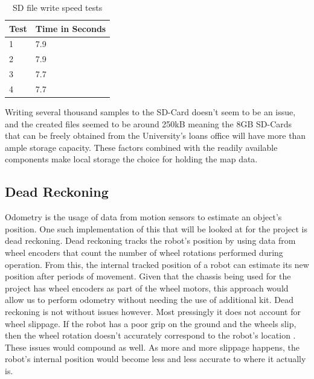 					\begin{table}[h!]
						\centering
						\begin{tabular}{|| l | l ||} 
							\hline
							Test & Time in Seconds \\ [0.5ex] 
							\hline
							1 & 7.9 \\ 
							2 & 7.9 \\
							3 & 7.7 \\
							4 & 7.7 \\ [1ex] 
							\hline
						\end{tabular}
						\caption{SD file write speed tests}
						\label{table:filewritetests}		
					\end{table}
					Writing several thousand samples to the SD-Card doesn't seem to be an issue, and the created files seemed to be around 250kB meaning the 8GB SD-Cards that can be freely obtained from the University's loans office will have more than ample storage capacity. These factors combined with the readily available components make local storage the choice for holding the map data.
				
				\subsection{Dead Reckoning}
				Odometry is the usage of data from motion sensors to estimate an object's position. One such implementation of this that will be looked at for the project is dead reckoning. Dead reckoning tracks the robot's position by using data from wheel encoders that count the number of wheel rotations performed during operation. From this, the internal tracked position of a robot can estimate its new position after periods of movement. Given that the chassis being used for the project has wheel encoders as part of the wheel motors, this approach would allow us to perform odometry without needing the use of additional kit. Dead reckoning is not without issues however. Most pressingly it does not account for wheel slippage. If the robot has a poor grip on the ground and the wheels slip, then the wheel rotation doesn't accurately correspond to the robot's location \citep{choset2001topological}. These issues would compound as well. As more and more slippage happens, the robot's internal position would become less and less accurate to where it actually is. 
				
